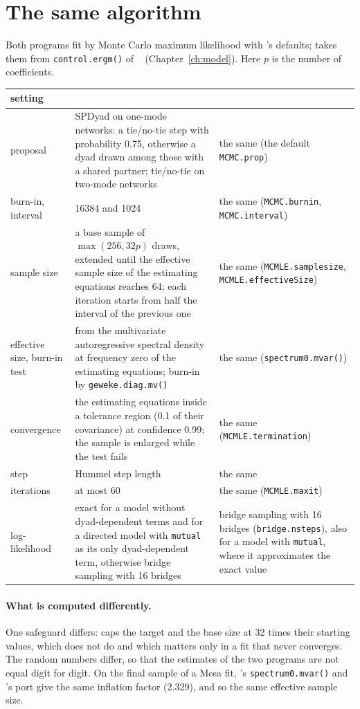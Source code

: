 \section{The same algorithm}\label{sec:samest-alg}

Both programs fit by Monte Carlo maximum likelihood with \ergm{}'s defaults; \nwergm{} takes them from \texttt{control.ergm()} of \ergm{}~\ergmver{} (Chapter~\ref{ch:model}). Here $p$ is the number of coefficients.

{\small
\begin{longtable}{@{}p{3.3cm}p{5.6cm}p{5.0cm}@{}}
\toprule
setting & \nwergm{} & \ergm{} \\
\midrule
\endhead
proposal & SPDyad on one-mode networks: a tie/no-tie step with probability 0.75, otherwise a dyad drawn among those with a shared partner; tie/no-tie on two-mode networks & the same (the default \texttt{MCMC.prop}) \\
burn-in, interval & 16384 and 1024 & the same (\texttt{MCMC.burnin}, \texttt{MCMC.interval}) \\
sample size & a base sample of $\max(256, 32p)$ draws, extended until the effective sample size of the estimating equations reaches 64; each iteration starts from half the interval of the previous one & the same (\texttt{MCMLE.samplesize}, \texttt{MCMLE.effectiveSize}) \\
effective size, burn-in test & from the multivariate autoregressive spectral density at frequency zero of the estimating equations; burn-in by \texttt{geweke.diag.mv()} & the same (\texttt{spectrum0.mvar()}) \\
convergence & the estimating equations inside a tolerance region (0.1 of their covariance) at confidence 0.99; the sample is enlarged while the test fails & the same (\texttt{MCMLE.termination}) \\
step & Hummel step length & the same \\
iterations & at most 60 & the same (\texttt{MCMLE.maxit}) \\
log-likelihood & exact for a model without dyad-dependent terms and for a directed model with \texttt{mutual} as its only dyad-dependent term, otherwise bridge sampling with 16 bridges & bridge sampling with 16 bridges (\texttt{bridge.nsteps}), also for a model with \texttt{mutual}, where it approximates the exact value \\
\bottomrule
\end{longtable}
}

\paragraph{What is computed differently.} One safeguard differs: \nwergm{} caps the target and the base size at 32 times their starting values, which \ergm{} does not do and which matters only in a fit that never converges. The random numbers differ, so that the estimates of the two programs are not equal digit for digit. On the final sample of a Mesa fit, \ergm{}'s \texttt{spectrum0.mvar()} and \nwergm{}'s port give the same inflation factor (2.329), and so the same effective sample size.

